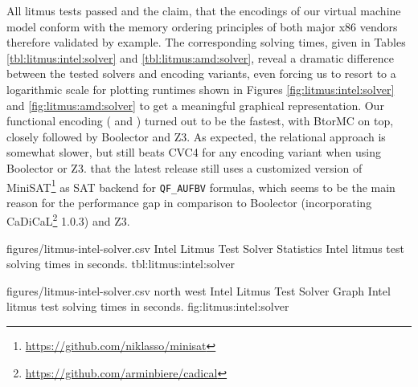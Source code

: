 All litmus tests passed and the claim, that the encodings of our virtual machine model conform with the memory ordering principles of both major x86 vendors therefore validated by example.
The corresponding solving times, given in Tables \ref{tbl:litmus:intel:solver} and \ref{tbl:litmus:amd:solver}, reveal a dramatic difference
between the tested solvers and encoding variants,
even forcing us to resort to
a logarithmic scale for plotting runtimes  shown in Figures \ref{fig:litmus:intel:solver} and \ref{fig:litmus:amd:solver} to get a meaningful graphical representation.
Our functional encoding ({\BTOR} and {\SMTLIB}) turned out to be the fastest, with BtorMC on top, closely followed by Boolector and Z3.
As expected, the relational {\SMTLIB} approach is somewhat slower, but still beats CVC4 for any encoding variant when using Boolector or Z3.
that the latest release still uses a customized version of MiniSAT\footnote{\url{https://github.com/niklasso/minisat}} %
as SAT backend for \texttt{QF_AUFBV} formulas, which seems to be the main reason
for the performance gap
in comparison to Boolector (incorporating CaDiCaL\footnote{\url{https://github.com/arminbiere/cadical}} 1.0.3) and Z3.

\newpage

\SolverStatsTable
  {figures/litmus-intel-solver.csv}
  {\textnumero}
  {\IntelRowHeader}
  {Intel Litmus Test Solver Statistics}
  {Intel litmus test solving times in seconds.}
  {tbl:litmus:intel:solver}

\SolverStatsGraph
  {figures/litmus-intel-solver.csv}
  {north west}
  {Intel Litmus Test Solver Graph}
  {Intel litmus test solving times in seconds.}
  {fig:litmus:intel:solver}

\newpage


